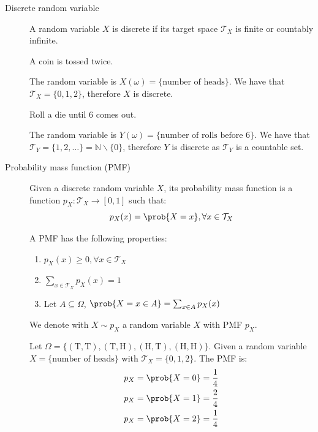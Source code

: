 \begin{description}
    \item[Discrete random variable] 
        A random variable $X$ is discrete if its target space $\mathcal{T}_X$ is finite or countably infinite.

        \begin{example}
            A coin is tossed twice.

            The random variable is $X(\omega) = \{ \text{number of heads} \}$.
            We have that $\mathcal{T}_X = \{ 0, 1, 2 \}$, therefore $X$ is discrete.
        \end{example}

        \begin{example}
            Roll a die until 6 comes out.

            The random variable is $Y(\omega) = \{ \text{number of rolls before 6} \}$.
            We have that $\mathcal{T}_Y = \{ 1, 2, \dots \} = \mathbb{N} \smallsetminus \{0\}$, 
            therefore $Y$ is discrete as $\mathcal{T}_Y$ is a countable set.
        \end{example}

    \item[Probability mass function (PMF)] 
        Given a discrete random variable $X$, its probability mass function is a function $p_X: \mathcal{T}_X \rightarrow [0, 1]$ such that:
        \[ p_X(x) = \prob{X = x}, \forall x \in \mathcal{T}_X \]

        A PMF has the following properties:
        \begin{enumerate}
            \item $p_X(x) \geq 0, \forall x \in \mathcal{T}_X$
            \item $\sum_{x \in \mathcal{T}_X} p_X(x) = 1$
            \item Let $A \subseteq \Omega$, $\prob{X = x \in A} = \sum_{x \in A} p_X(x)$
        \end{enumerate}

        We denote with $X \sim p_X$ a random variable $X$ with PMF $p_X$.

        \begin{example}
            Let $\Omega = \{ (\text{T}, \text{T}), (\text{T}, \text{H}), (\text{H}, \text{T}), (\text{H}, \text{H}) \}$.
            Given a random variable $X = \{ \text{number of heads} \}$ with $\mathcal{T}_X = \{ 0, 1, 2 \}$.
            The PMF is:
            \[
                \begin{split}
                    p_X &= \prob{X = 0} = \frac{1}{4} \\
                    p_X &= \prob{X = 1} = \frac{2}{4} \\
                    p_X &= \prob{X = 2} = \frac{1}{4}
                \end{split}  
            \]
        \end{example}
\end{description}


